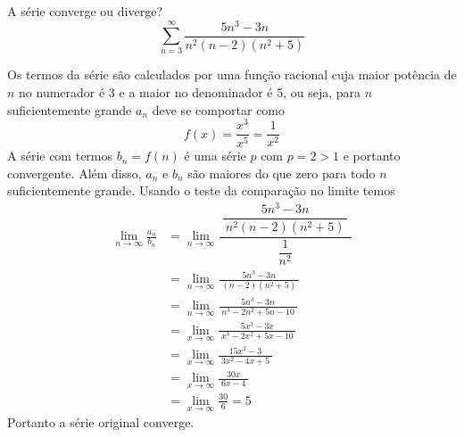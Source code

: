 \begin{exercises}
\begin{exercise}
  A série converge ou diverge?
  \[
    \sum_{n=3}^{\infty} \frac{5n^3-3n}{n^2(n-2)(n^2+5)}
  \]
  \begin{answer}
    Os termos da série são calculados por uma função racional cuja maior potência de $n$ no numerador
    é 3 e a maior no denominador é 5, ou seja, para $n$ suficientemente grande $a_n$ deve se comportar
    como
    \[
      f(x) = \frac{x^3}{x^5} = \frac{1}{x^2}
    \]
    A série com termos $b_n=f(n)$ é uma série $p$ com $p=2>1$ e portanto convergente.
    Além disso, $a_n$ e $b_n$ são maiores do que zero para todo $n$ suficientemente grande.
    Usando o teste da comparação no limite temos
    \begin{align*}
      \lim_{n\to\infty} \frac{a_n}{b_n}
      & = \lim_{n\to\infty} \dfrac{\; \dfrac{5n^3-3n}{\,n^2(n-2)(n^2+5)\,}\;}{\dfrac{1}{n^2}} \\[2mm]
      & = \lim_{n\to\infty} \frac{5n^3-3n}{\;(n-2)(n^2+5)\;}                                  \\[2mm]
      & = \lim_{n\to\infty} \frac{5n^3-3n}{\;n^3 -2n^2 +5n -10\;}                             \\[2mm]
      & = \lim_{x\to\infty} \frac{5x^3-3x}{\;x^3 -2x^2 +5x -10\;}                             \\[2mm]
      & = \lim_{x\to\infty} \frac{15x^2-3}{\;3x^2 -4x +5\;}                                   \\[2mm]
      & = \lim_{x\to\infty} \frac{30x}{\;6x-4\;}                                              \\[2mm]
      & = \lim_{x\to\infty} \frac{30}{6} = 5
    \end{align*}
    Portanto a série original converge.
  \end{answer}
\end{exercise}


\end{exercises}
